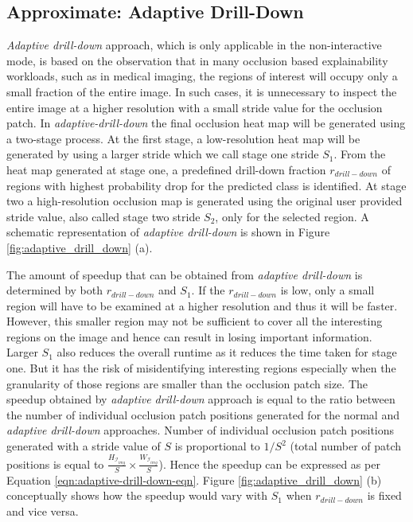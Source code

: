 \subsection{Approximate: Adaptive Drill-Down}\label{sec:ada-drill-down}
\textit{Adaptive drill-down} approach, which is only applicable in the non-interactive mode, is based on the observation that in many occlusion based explainability workloads, such as in medical imaging, the regions of interest will occupy only a small fraction of the entire image.
In such cases, it is unnecessary to inspect the entire image at a higher resolution with a small stride value for the occlusion patch.
In \textit{adaptive-drill-down} the final occlusion heat map will be generated using a two-stage process.
At the first stage, a low-resolution heat map will be generated by using a larger stride which we call stage one stride $S_1$.
From the heat map generated at stage one, a predefined drill-down fraction $r_{drill-down}$ of regions with highest probability drop for the predicted class is identified.
At stage two a high-resolution occlusion map is generated using the original user provided stride value, also called stage two stride $S_2$, only for the selected region.
A schematic representation of \textit{adaptive drill-down} is shown in Figure \ref{fig:adaptive_drill_down} (a).


The amount of speedup that can be obtained from \textit{adaptive drill-down} is determined by both $r_{drill-down}$ and $S_1$.
If the $r_{drill-down}$ is low, only a small region will have to be examined at a higher resolution and thus it will be faster.
However, this smaller region may not be sufficient to cover all the interesting regions on the image and hence can result in losing important information.
Larger $S_1$ also reduces the overall runtime as it reduces the time taken for stage one.
But it has the risk of misidentifying interesting regions especially when the granularity of those regions are smaller than the occlusion patch size.
The speedup obtained by \textit{adaptive drill-down} approach is equal to the ratio between the number of individual occlusion patch positions generated for the normal and \textit{adaptive drill-down} approaches.
Number of individual occlusion patch positions generated with a stride value of $S$ is proportional to $1/S^2$ (total number of patch positions is equal to $\frac{H_{\mathcal{I}_{img}}}{S} \times \frac{W_{\mathcal{I}_{img}}}{S}$).
Hence the speedup can  be expressed as per Equation \ref{eqn:adaptive-drill-down-eqn}.
Figure \ref{fig:adaptive_drill_down} (b) conceptually shows how the speedup would vary with $S_1$ when $r_{drill-down}$ is fixed and vice versa.

